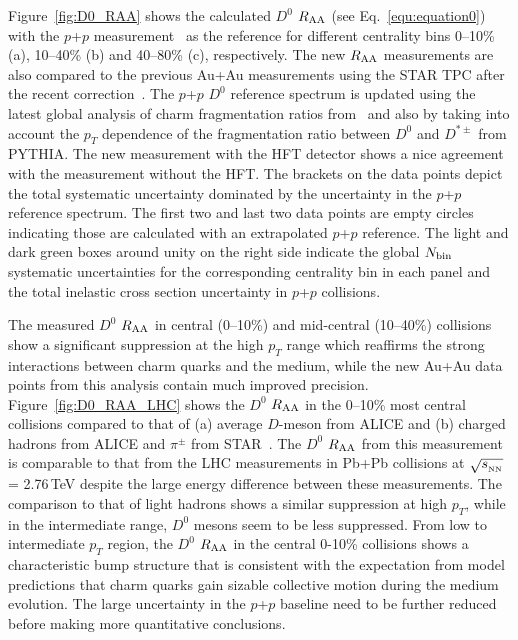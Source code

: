\documentclass[%
 reprint,	
showpacs,
 amsmath,amssymb,
 aps,
 prc,
]{revtex4-1}
\begin{document}
Figure~\ref{fig:D0_RAA} shows the calculated $D^0$ $R_{\rm AA}$ (see Eq.~\ref{equ:equation0}) with the $p$+$p$ measurement~\cite{Star_D_pp} as the reference for different centrality bins 0--10\% (a), 10--40\% (b) and 40--80\% (c), respectively. The new $R_{\rm AA}$ measurements are also compared to the previous Au+Au measurements using the STAR TPC after the recent correction~\cite{Star_D_RAA}. The $p$+$p$ $D^0$ reference spectrum is updated using the latest global analysis of charm fragmentation ratios from~\cite{charm_frag} and also by taking into account the $p_T$ dependence of the fragmentation ratio between $D^0$ and $D^{*\pm}$ from PYTHIA. The new measurement with the HFT detector shows a nice agreement with the measurement without the HFT. The brackets on the data points depict the total systematic uncertainty dominated by the uncertainty in the $p$+$p$ reference spectrum. The first two and last two data points are empty circles indicating those are calculated with an extrapolated $p$+$p$ reference. The light and dark green boxes around unity on the right side indicate the global $N_{\rm bin}$ systematic uncertainties for the corresponding centrality bin in each panel and the total inelastic cross section uncertainty in $p$+$p$ collisions.

The measured $D^0$ $R_{\rm AA}$ in central (0--10\%) and mid-central (10--40\%) collisions show a significant suppression at the high $p_{T}$ range which reaffirms the strong interactions between charm quarks and the medium, while the new Au+Au data points from this analysis contain much improved precision. Figure~\ref{fig:D0_RAA_LHC} shows the $D^0$ $R_{\rm AA}$ in the 0--10\% most central collisions compared to that of (a) average $D$-meson from ALICE and (b) charged hadrons from ALICE and $\pi^{\pm}$ from STAR~\cite{Alice_D_RAA_2,Alice_hadron_RAA,StarPi0}. The $D^0$ $R_{\rm AA}$ from this measurement is comparable to that from the LHC measurements in Pb+Pb collisions at $\sqrt{s_{_{\rm NN}}}$ = 2.76\,TeV despite the large energy difference between these measurements.
The comparison to that of light hadrons shows a similar suppression at high $p_{T}$, while in the intermediate range, $D^0$ mesons seem to be less suppressed. From low to intermediate $p_{T}$ region, the $D^0$ $R_{\rm AA}$ in the central 0-10\% collisions shows a characteristic bump structure that is consistent with the expectation from model predictions that charm quarks gain sizable collective motion during the medium evolution. The large uncertainty in the $p$+$p$ baseline need to be further reduced before making more quantitative conclusions.
\end{document}
